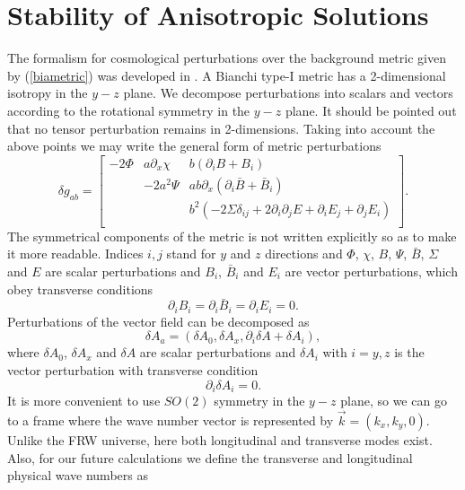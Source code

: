 \documentclass[%
 reprint,
 amsmath,amssymb,
 aps,
]{revtex4-1}
\begin{document}
\section{Stability of Anisotropic Solutions}
The formalism for cosmological perturbations over the background metric given by (\ref{biametric}) was developed in \cite{Gumrukcuoglu:2007bx,Himmetoglu:2008hx,Himmetoglu:2009}. A Bianchi type-I metric has a 2-dimensional isotropy in the $y-z$ plane. We decompose perturbations into scalars and vectors according to the rotational symmetry in the $y-z$ plane. It should be pointed out that no tensor perturbation remains in 2-dimensions. Taking into account the above points we may write the general form of metric perturbations
\begin{equation}
\delta g_{ab}=
\begin{bmatrix}
-2\Phi       & a\partial_x\chi   &b(\partial_iB+B_i)\\
             & -2a^2\Psi         &ab\partial_x(\partial_i\bar{B}+\bar{B}_i)\\
             &                   & b^2(-2\Sigma\delta_{ij}+2\partial_i\partial_jE+\partial_iE_j+\partial_jE_i )\\
\end{bmatrix}.
\end{equation}
The symmetrical components of the metric is not written explicitly so as to make it more readable. Indices $i,j$ stand for $y$ and $z$ directions and $\Phi$, $\chi$, $B$, $\Psi$, $\bar{B}$, $\Sigma$ and $E$ are scalar perturbations and $B_i$, $\bar{B}_i$ and $E_i$ are vector perturbations, which obey transverse conditions
\begin{equation}\label{tr1}
\partial_iB_i=\partial_i\bar{B}_i=\partial_i E_i=0.
\end{equation}
Perturbations of the vector field can be decomposed as
\begin{equation}
\delta A_a=(\delta A_0,\delta A_x,\partial_i\delta A+\delta A_i),
\end{equation}
where $\delta A_0$, $\delta A_x$ and $\delta A$ are scalar perturbations and $\delta A_i$ with $i=y,z$ is the vector perturbation with transverse condition
\begin{equation}\label{tr2}
\partial_i \delta A_i=0.
\end{equation}
It is more convenient to use $SO(2)$ symmetry in the $y-z$ plane, so we can go to a frame where the wave number vector is represented by $\vec{k}=(k_x,k_y,0)$. Unlike the FRW universe, here both longitudinal and transverse modes exist. Also, for our future calculations we define the transverse and longitudinal physical wave numbers as
\end{document}
